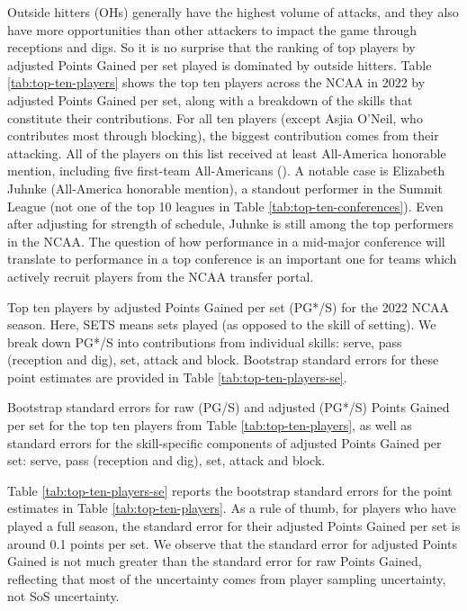 \documentclass[USenglish]{article}
\theoremstyle{dgthm}
\theoremstyle{dgdef}
\begin{document}
Outside hitters (OHs) generally have the highest volume of attacks, and they also have more opportunities than other attackers to impact the game through receptions and digs. So it is no surprise that the ranking of top players by adjusted Points Gained per set played is dominated by outside hitters. Table \ref{tab:top-ten-players} shows the top ten players across the NCAA in 2022 by adjusted Points Gained per set, along with a breakdown of the skills that constitute their contributions. For all ten players (except Asjia O'Neil, who contributes most through blocking), the biggest contribution comes from their attacking. All of the players on this list received at least All-America honorable mention, including five first-team All-Americans (\cite{avca_all_america}). A notable case is Elizabeth Juhnke (All-America honorable mention), a standout performer in the Summit League (not one of the top 10 leagues in Table \ref{tab:top-ten-conferences}). Even after adjusting for strength of schedule, Juhnke is still among the top performers in the NCAA. The question of how performance in a mid-major conference will translate to performance in a top conference is an important one for teams which actively recruit players from the NCAA transfer portal.

\begin{table}
    \centering
    
    \caption{Top ten players by adjusted Points Gained per set (PG*/S) for the 2022 NCAA season. Here, SETS means sets played (as opposed to the skill of setting). We break down PG*/S into contributions from individual skills: serve, pass (reception and dig), set, attack and block. Bootstrap standard errors for these point estimates are provided in Table \ref{tab:top-ten-players-se}.}
    \label{tab:top-ten-players}
\end{table}

\begin{table}
    \centering
    
    \caption{Bootstrap standard errors for raw (PG/S) and adjusted (PG*/S) Points Gained per set for the top ten players from Table \ref{tab:top-ten-players}, as well as standard errors for the skill-specific components of adjusted Points Gained per set: serve, pass (reception and dig), set, attack and block.}
    \label{tab:top-ten-players-se}
\end{table}

Table \ref{tab:top-ten-players-se} reports the bootstrap standard errors for the point estimates in Table \ref{tab:top-ten-players}. As a rule of thumb, for players who have played a full season, the standard error for their adjusted Points Gained per set is around 0.1 points per set. We observe that the standard error for adjusted Points Gained is not much greater than the standard error for raw Points Gained, reflecting that most of the uncertainty comes from player sampling uncertainty, not SoS uncertainty.
\end{document}
